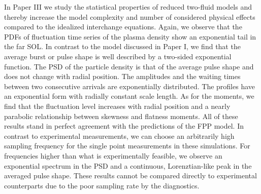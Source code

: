 In Paper III we study the statistical properties of reduced two-fluid models and thereby increase the model complexity and number of considered physical effects compared to the idealized interchange equations. Again, we observe that the PDFs of fluctuation time series of the plasma density show an exponential tail in the far SOL. In contrast to the model discussed in Paper I, we find that the average burst or pulse shape is well described by a two-sided
exponential function. The PSD of the particle density is that of the average pulse shape and does not change with radial position. The amplitudes and the waiting times between two consecutive arrivals are exponentially distributed. The profiles have an exponential form with radially constant scale length. As for the moments, we find that the fluctuation level increases with radial position and a nearly parabolic relationship between skewness and flatness moments. All of these results stand in perfect agreement with the predictions of the FPP model. In contrast to experimental measurements, we can choose an arbitrarily high sampling frequency for the single point measurements in these simulations. For frequencies higher than what is experimentally feasible, we observe an exponential spectrum in the PSD and a continuous, Lorenztian-like peak in the averaged pulse shape. These results cannot be compared directly to experimental counterparts due to the poor sampling rate by the diagnostics. 

